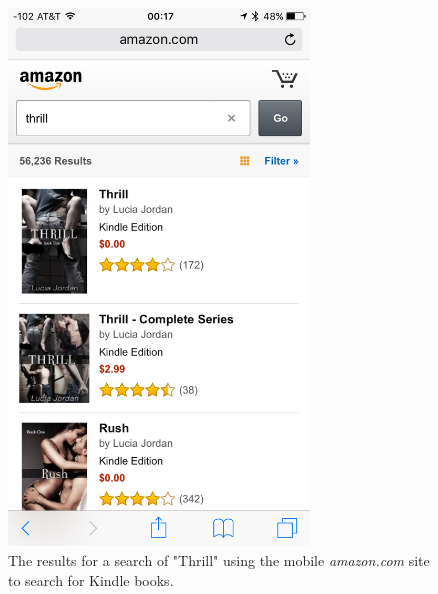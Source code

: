 \documentclass[journal, a4paper]{IEEEtran}
\begin{document}
    \begin{figure}[!hbt]
		\begin{center}
		\includegraphics[width=8cm]{kindleDownload}
		\caption{The results for a search of "Thrill" using the mobile \emph{amazon.com} site to search for Kindle books.}
		\label{fig:kindleDownload}
		\end{center}
	\end{figure}
    
\end{document}
